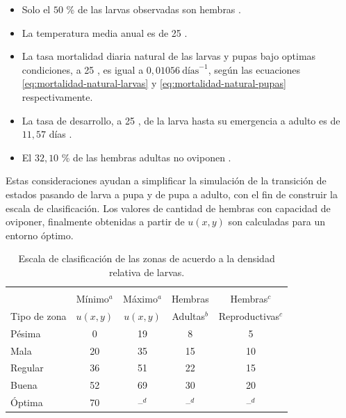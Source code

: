 \begin{itemize}
    \item Solo el $50$ \% de las larvas observadas son hembras \cite{otero2006stochastic, manrique1998desarrollo}.
    \item La temperatura media anual es de 25 \textcelsius \cite{website:mspbsHistoria2014}.
    \item La tasa mortalidad diaria natural de las larvas y pupas bajo optimas condiciones, a 25 \textcelsius, es igual a $0,01056\ \text{días}^{-1}$, según las ecuaciones \eqref{eq:mortalidad-natural-larvas} y \eqref{eq:mortalidad-natural-pupas} respectivamente.
    \item La tasa de desarrollo, a 25 \textcelsius, de la larva hasta su emergencia a adulto es de $11,57$ días \cite{rueda1990temperature}.
    \item El $32,10$ \% de las hembras adultas no oviponen \cite{osoriopontificia}.
\end{itemize}

Estas consideraciones ayudan a simplificar la simulación de la transición de estados pasando de
larva a pupa y de pupa a adulto, con el fin de construir la escala de clasificación. Los valores
de cantidad de hembras con capacidad de oviponer, finalmente obtenidas a partir de $u(x,y)$ son
calculadas para un entorno óptimo.

\begin{table}[!hptb]
    \begin{center}
    \begin{minipage}{\textwidth}
    \begin{center}
        \caption{\label{tab:cap4-puntaje-zona} Escala de clasificación de las zonas de acuerdo a la densidad relativa de larvas.}
        \begin{tabular}{p{3cm} c c c c}
            \hline \\
                         & Mínimo$^a$ & Máximo$^a$ & Hembras     & Hembras$^c$ \\
            Tipo de zona & $u(x,y)$   & $u(x,y)$   & Adultas$^b$ & Reproductivas$^c$ \\
            \hline
            \hline
            Pésima  & 0  & 19 & 8  & 5 \\
            Mala    & 20 & 35 & 15 & 10\\
            Regular & 36 & 51 & 22 & 15\\
            Buena   & 52 & 69 & 30 & 20\\
            Óptima  & 70 & --$^d$ & --$^d$ & --$^d$\\
        \end{tabular}
    \end{center}
    \end{minipage}
    \end{center}
\end{table}

